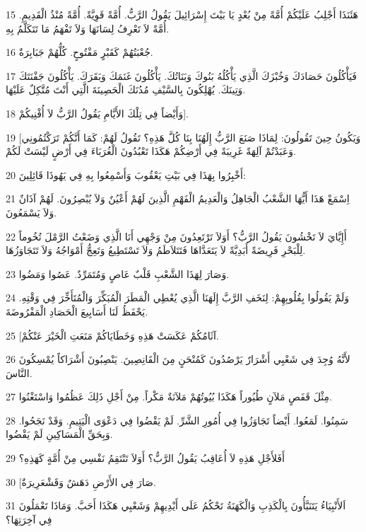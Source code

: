 \par 15 هَئَنَذَا أَجْلِبُ عَلَيْكُمْ أُمَّةً مِنْ بُعْدٍ يَا بَيْتَ إِسْرَائِيلَ يَقُولُ الرَّبُّ. أُمَّةً قَوِيَّةً. أُمَّةً مُنْذُ الْقَدِيمِ. أُمَّةً لاَ تَعْرِفُ لِسَانَهَا وَلاَ تَفْهَمُ مَا تَتَكَلَّمُ بِهِ.
\par 16 جُعْبَتُهُمْ كَقَبْرٍ مَفْتُوحٍ. كُلُّهُمْ جَبَابِرَةٌ.
\par 17 فَيَأْكُلُونَ حَصَادَكَ وَخُبْزَكَ الَّذِي يَأْكُلُهُ بَنُوكَ وَبَنَاتُكَ. يَأْكُلُونَ غَنَمَكَ وَبَقَرَكَ. يَأْكُلُونَ جَفْنَتَكَ وَتِينَكَ. يُهْلِكُونَ بِالسَّيْفِ مُدُنَكَ الْحَصِينَةَ الَّتِي أَنْتَ مُتَّكِلٌ عَلَيْهَا.
\par 18 وَأَيْضاً فِي تِلْكَ الأَيَّامِ يَقُولُ الرَّبُّ لاَ أُفْنِيكُمْ].
\par 19 [وَيَكُونُ حِينَ تَقُولُونَ: لِمَاذَا صَنَعَ الرَّبُّ إِلَهُنَا بِنَا كُلَّ هَذِهِ؟ تَقُولُ لَهُمْ: كَمَا أَنَّكُمْ تَرَكْتُمُونِي وَعَبَدْتُمْ آلِهَةً غَرِيبَةً فِي أَرْضِكُمْ هَكَذَا تَعْبُدُونَ الْغُرَبَاءَ فِي أَرْضٍ لَيْسَتْ لَكُمْ.
\par 20 أَخْبِرُوا بِهَذَا فِي بَيْتِ يَعْقُوبَ وَأَسْمِعُوا بِهِ فِي يَهُوذَا قَائِلِينَ:
\par 21 اِسْمَعْ هَذَا أَيُّهَا الشَّعْبُ الْجَاهِلُ وَالْعَدِيمُ الْفَهْمِ الَّذِينَ لَهُمْ أَعْيُنٌ وَلاَ يُبْصِرُونَ. لَهُمْ آذَانٌ وَلاَ يَسْمَعُونَ.
\par 22 أَإِيَّايَ لاَ تَخْشُونَ يَقُولُ الرَّبُّ؟ أَوَلاَ تَرْتَعِدُونَ مِنْ وَجْهِي أَنَا الَّذِي وَضَعْتُ الرَّمْلَ تُخُوماً لِلْبَحْرِ فَرِيضَةً أَبَدِيَّةً لاَ يَتَعَدَّاهَا فَتَتَلاَطَمُ وَلاَ تَسْتَطِيعُ وَتَعِجُّ أَمْوَاجُهُ وَلاَ تَتَجَاوَزُهَا.
\par 23 وَصَارَ لِهَذَا الشَّعْبِ قَلْبٌ عَاصٍ وَمُتَمَرِّدٌ. عَصُوا وَمَضُوا.
\par 24 وَلَمْ يَقُولُوا بِقُلُوبِهِمْ: لِنَخَفِ الرَّبَّ إِلَهَنَا الَّذِي يُعْطِي الْمَطَرَ الْمُبَكِّرَ وَالْمُتَأَخِّرَ فِي وَقْتِهِ. يَحْفَظُ لَنَا أَسَابِيعَ الْحَصَادِ الْمَفْرُوضَةَ.
\par 25 [آثَامُكُمْ عَكَسَتْ هَذِهِ وَخَطَايَاكُمْ مَنَعَتِ الْخَيْرَ عَنْكُمْ.
\par 26 لأَنَّهُ وُجِدَ فِي شَعْبِي أَشْرَارٌ يَرْصُدُونَ كَمُنْحَنٍ مِنَ الْقَانِصِينَ. يَنْصِبُونَ أَشْرَاكاً يُمْسِكُونَ النَّاسَ.
\par 27 مِثْلَ قَفَصٍ مَلآنٍ طُيُوراً هَكَذَا بُيُوتُهُمْ مَلآنَةٌ مَكْراً. مِنْ أَجْلِ ذَلِكَ عَظُمُوا وَاسْتَغْنُوا.
\par 28 سَمِنُوا. لَمَعُوا. أَيْضاً تَجَاوَزُوا فِي أُمُورِ الشَّرِّ. لَمْ يَقْضُوا فِي دَعْوَى الْيَتِيمِ. وَقَدْ نَجَحُوا. وَبِحَقِّ الْمَسَاكِينِ لَمْ يَقْضُوا.
\par 29 أَفَلأَجْلِ هَذِهِ لاَ أُعَاقِبُ يَقُولُ الرَّبُّ؟ أَوَلاَ تَنْتَقِمُ نَفْسِي مِنْ أُمَّةٍ كَهَذِهِ؟
\par 30 [صَارَ فِي الأَرْضِ دَهَشٌ وَقَشْعَرِيرَةٌ.
\par 31 اَلأَنْبِيَاءُ يَتَنَبَّأُونَ بِالْكَذِبِ وَالْكَهَنَةُ تَحْكُمُ عَلَى أَيْدِيهِمْ وَشَعْبِي هَكَذَا أَحَبَّ. وَمَاذَا تَعْمَلُونَ فِي آخِرَتِهَا؟

